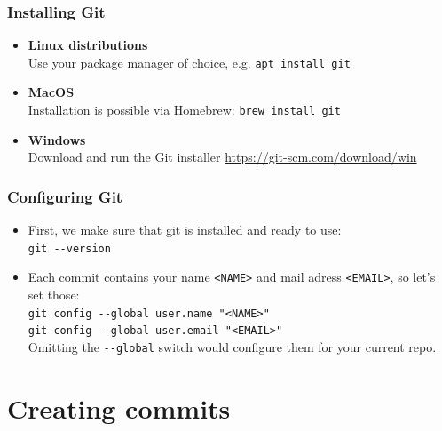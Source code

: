 \documentclass[compress,aspectratio=169]{beamer}
\newcommand{\console}[1]{
  \colorbox{bgcolor}{\texttt{#1}}
}
\begin{document}
\begin{frame}
  \frametitle{Installing Git}
  \begin{itemize}
    \item \textbf{Linux distributions}\\Use your package manager of choice, e.g. \texttt{apt install git}
    \item \textbf{MacOS}\\Installation is possible via Homebrew: \texttt{brew install git}
    \item \textbf{Windows}\\Download and run the Git installer \url{https://git-scm.com/download/win}
  \end{itemize}
\end{frame}

\begin{frame}
  \frametitle{Configuring Git}
  \begin{itemize}
    \item First, we make sure that git is installed and ready to use:\\
      \console{git -\phantom{}-version}
    \item Each commit contains your name \texttt{<NAME>} and mail adress \texttt{<EMAIL>}, so let's set those:\\
      \console{git config -\phantom{}-global user.name "<NAME>"}\\
      \console{git config -\phantom{}-global user.email "<EMAIL>"}\\
      Omitting the \texttt{-\phantom{}-global} switch would configure them for your current repo.
  \end{itemize}
\end{frame}

\section{Creating commits}
\end{document}
